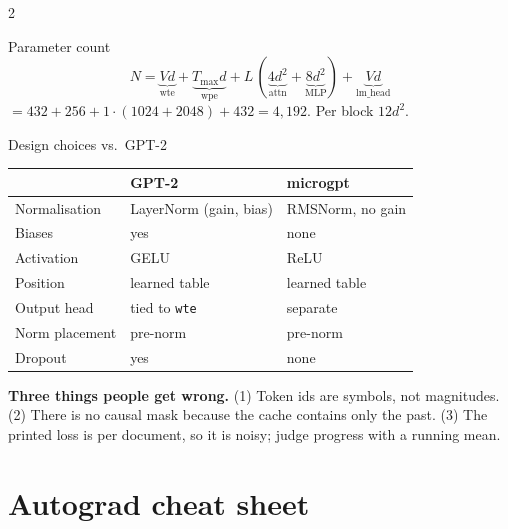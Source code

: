 \documentclass[10pt,letterpaper]{article}
\newcommand{\code}[1]{\lstinline[basicstyle=\ttfamily\small]|#1|}
\begin{document}
\begin{multicols}{2}
\begin{csb}{Parameter count}
\[
N = \underbrace{Vd}_{\text{wte}} + \underbrace{T_{\max}d}_{\text{wpe}} + L\,(\underbrace{4d^2}_{\text{attn}} + \underbrace{8d^2}_{\text{MLP}}) + \underbrace{Vd}_{\text{lm\_head}}
\]
$= 432 + 256 + 1\cdot(1024+2048) + 432 = 4{,}192$. Per block $12d^2$.
\end{csb}

\begin{csb}{Design choices vs.\ GPT-2}
\begin{tabular}{@{}lll@{}}
\toprule
& GPT-2 & microgpt \\
\midrule
Normalisation & LayerNorm (gain, bias) & RMSNorm, no gain \\
Biases & yes & none \\
Activation & GELU & ReLU \\
Position & learned table & learned table \\
Output head & tied to \code{wte} & separate \\
Norm placement & pre-norm & pre-norm \\
Dropout & yes & none \\
\bottomrule
\end{tabular}
\end{csb}

\begin{warn}
\textbf{Three things people get wrong.}
(1) Token ids are symbols, not magnitudes.
(2) There is no causal mask because the cache contains only the past.
(3) The printed loss is per document, so it is noisy; judge progress with a running mean.
\end{warn}
\end{multicols}

\clearpage
\section{Autograd cheat sheet}
\end{document}

